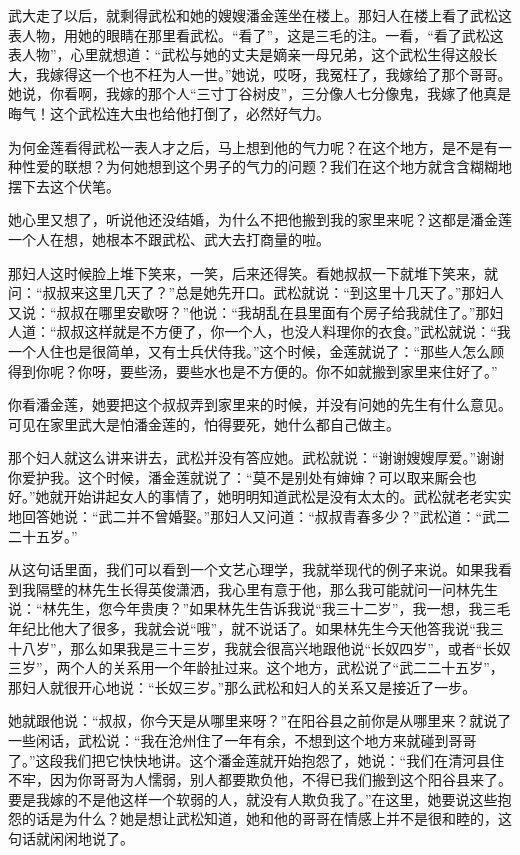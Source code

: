 \par 武大走了以后，就剩得武松和她的嫂嫂潘金莲坐在楼上。那妇人在楼上看了武松这表人物，用她的眼睛在那里看武松。“看了”，这是三毛的注。一看，“看了武松这表人物”，心里就想道：“武松与她的丈夫是嫡亲一母兄弟，这个武松生得这般长大，我嫁得这一个也不枉为人一世。”她说，哎呀，我冤枉了，我嫁给了那个哥哥。她说，你看啊，我嫁的那个人“三寸丁谷树皮”，三分像人七分像鬼，我嫁了他真是晦气！这个武松连大虫也给他打倒了，必然好气力。
\par 为何金莲看得武松一表人才之后，马上想到他的气力呢？在这个地方，是不是有一种性爱的联想？为何她想到这个男子的气力的问题？我们在这个地方就含含糊糊地摆下去这个伏笔。
\par 她心里又想了，听说他还没结婚，为什么不把他搬到我的家里来呢？这都是潘金莲一个人在想，她根本不跟武松、武大去打商量的啦。
\par 那妇人这时候脸上堆下笑来，一笑，后来还得笑。看她叔叔一下就堆下笑来，就问：“叔叔来这里几天了？”总是她先开口。武松就说：“到这里十几天了。”那妇人又说：“叔叔在哪里安歇呀？”他说：“我胡乱在县里面有个房子给我就住了。”那妇人道：“叔叔这样就是不方便了，你一个人，也没人料理你的衣食。”武松就说：“我一个人住也是很简单，又有士兵伏侍我。”这个时候，金莲就说了：“那些人怎么顾得到你呢？你呀，要些汤，要些水也是不方便的。你不如就搬到家里来住好了。”
\par 你看潘金莲，她要把这个叔叔弄到家里来的时候，并没有问她的先生有什么意见。可见在家里武大是怕潘金莲的，怕得要死，她什么都自己做主。
\par 那个妇人就这么讲来讲去，武松并没有答应她。武松就说：“谢谢嫂嫂厚爱。”谢谢你爱护我。这个时候，潘金莲就说了：“莫不是别处有婶婶？可以取来厮会也好。”她就开始讲起女人的事情了，她明明知道武松是没有太太的。武松就老老实实地回答她说：“武二并不曾婚娶。”那妇人又问道：“叔叔青春多少？”武松道：“武二二十五岁。”
\par 从这句话里面，我们可以看到一个文艺心理学，我就举现代的例子来说。如果我看到我隔壁的林先生长得英俊潇洒，我心里有意于他，那么我可能就问一问林先生说：“林先生，您今年贵庚？”如果林先生告诉我说“我三十二岁”，我一想，我三毛年纪比他大了很多，我就会说“哦”，就不说话了。如果林先生今天他答我说“我三十八岁”，那么如果我是三十三岁，我就会很高兴地跟他说“长奴四岁”，或者“长奴三岁”，两个人的关系用一个年龄扯过来。这个地方，武松说了“武二二十五岁”，那妇人就很开心地说：“长奴三岁。”那么武松和妇人的关系又是接近了一步。
\par 她就跟他说：“叔叔，你今天是从哪里来呀？”在阳谷县之前你是从哪里来？就说了一些闲话，武松说：“我在沧州住了一年有余，不想到这个地方来就碰到哥哥了。”这段我们把它快快地讲。这个潘金莲就开始抱怨了，她说：“我们在清河县住不牢，因为你哥哥为人懦弱，别人都要欺负他，不得已我们搬到这个阳谷县来了。要是我嫁的不是他这样一个软弱的人，就没有人欺负我了。”在这里，她要说这些抱怨的话是为什么？她是想让武松知道，她和他的哥哥在情感上并不是很和睦的，这句话就闲闲地说了。

